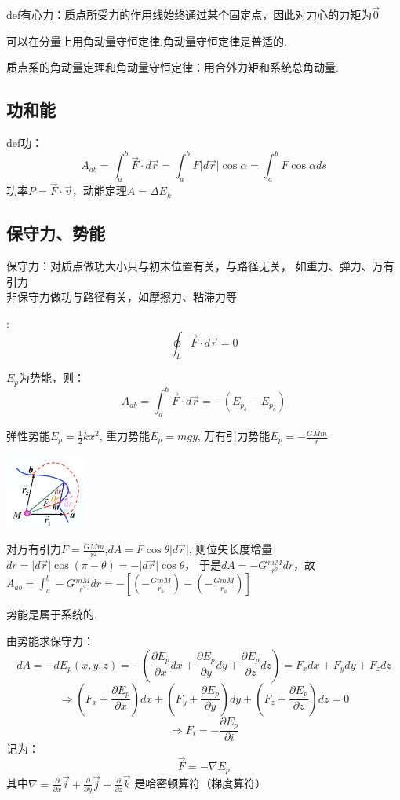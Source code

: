 \documentclass[10pt,a4paper]{article}
\begin{document}
def有心力：质点所受力的作用线始终通过某个固定点，因此对力心的力矩为$\vec{0}$

可以在分量上用角动量守恒定律.角动量守恒定律是普适的.

质点系的角动量定理和角动量守恒定律：用合外力矩和系统总角动量.
\subsection{功和能}
def功：
\[A_{ab}=\int_a^b \vec{F}\cdot d\vec{r}=
\int_a^b F\lvert d\vec{r} \rvert \cos\alpha=
\int_a^b F \cos\alpha ds\]
功率$P=\vec{F}\cdot \vec{v}$，动能定理$A=\Delta E_k$
\subsection{保守力、势能}
保守力：对质点做功大小只与初末位置有关，与路径无关，
如重力、弹力、万有引力\\
非保守力做功与路径有关，如摩擦力、粘滞力等

\underline{}:
\[
\oint_L \vec{F}\cdot d\vec{r}=0
\]

$E_p$为势能，则\underline{}：
\[A_{ab}=\int_a^b \vec{F}\cdot d\vec{r}=-(E_{p_b}-E_{p_a})\]

弹性势能$E_p=\frac{1}{2}kx^2$,
重力势能$E_p=mgy$,
万有引力势能$E_p=-\frac{GMm}{r}$
\begin{center}
    \includegraphics[width=0.2\textwidth]{1.jpg}
\end{center}
对万有引力$F=\frac{GMm}{r^2}$,$dA=F\cos\theta\lvert d\vec{r} \rvert$,
则位矢长度增量$dr=\lvert d\vec{r} \rvert\cos(\pi-\theta)
=-\lvert d\vec{r} \rvert\cos\theta$，
于是$dA=-G\frac{mM}{r^2}dr$，故
$A_{ab}=\int_a^b -G\frac{mM}{r^2}dr=-[(-\frac{GmM}{r_b})-(-\frac{GmM}{r_a})]$

势能是属于系统的.

由势能求保守力：
\[dA=-dE_p(x,y,z)=-(\frac{\partial E_p}{\partial x}dx+\frac{\partial E_p}{\partial y}dy+\frac{\partial E_p}{\partial z}dz)
=F_x dx+F_y dy+F_z dz\]
\[\Rightarrow
(F_x+\frac{\partial E_p}{\partial x})dx+
(F_y+\frac{\partial E_p}{\partial y})dy+
(F_z+\frac{\partial E_p}{\partial z})dz=0
\]
\[
\Rightarrow
F_i=-\frac{\partial E_p}{\partial i}
\]记为：
\[\boxed{\vec{F}=-\nabla E_p}\]
其中$\nabla=\frac{\partial}{\partial x}\vec{i}+\frac{\partial}{\partial y}\vec{j}+\frac{\partial}{\partial z}\vec{k}$
是哈密顿算符（梯度算符）
\end{document}
